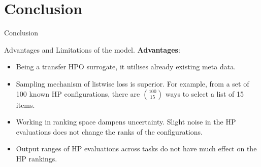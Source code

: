 \documentclass{beamer}
\begin{document}
\section{Conclusion}
\begin{frame}
\centering
\LARGE{Conclusion}
\end{frame}

\begin{frame}[t]{Advantages and Limitations of the model.}
\textbf{Advantages}:
\begin{itemize}
\item Being a transfer HPO surrogate,  it utilises already existing meta data.
\item Sampling mechanism of listwise loss is superior.   For example,  from a set of 100 known HP configurations, there are ${100 \choose 15}$ ways to select a list of 15 items.
\item Working in ranking space dampens uncertainty. Slight noise in the HP evaluations does not change the ranks of the configurations.
\item Output ranges of HP evaluations across tasks do not have much effect on the HP rankings.
\end{itemize}
\end{frame}
\end{document}
